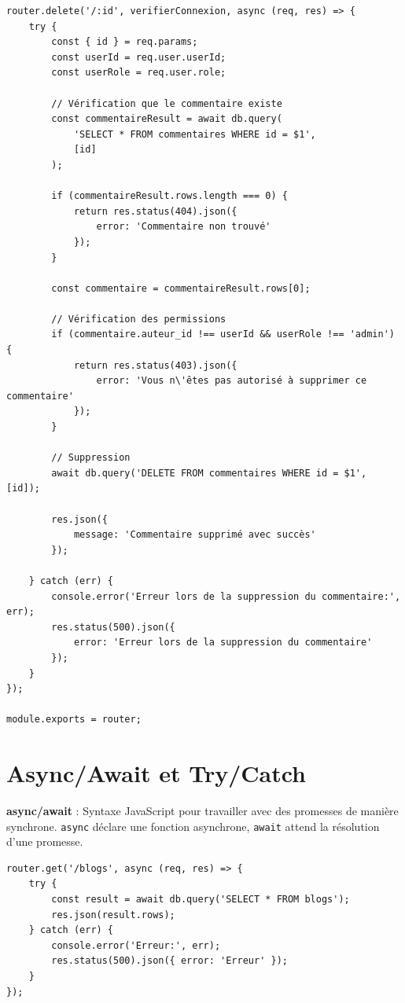 \begin{lstlisting}[style=javascript, caption=routes/commentaires.js - Routes des commentaires complètes]
router.delete('/:id', verifierConnexion, async (req, res) => {
    try {
        const { id } = req.params;
        const userId = req.user.userId;
        const userRole = req.user.role;
        
        // Vérification que le commentaire existe
        const commentaireResult = await db.query(
            'SELECT * FROM commentaires WHERE id = $1',
            [id]
        );
        
        if (commentaireResult.rows.length === 0) {
            return res.status(404).json({ 
                error: 'Commentaire non trouvé' 
            });
        }
        
        const commentaire = commentaireResult.rows[0];
        
        // Vérification des permissions
        if (commentaire.auteur_id !== userId && userRole !== 'admin') {
            return res.status(403).json({ 
                error: 'Vous n\'êtes pas autorisé à supprimer ce commentaire' 
            });
        }
        
        // Suppression
        await db.query('DELETE FROM commentaires WHERE id = $1', [id]);
        
        res.json({ 
            message: 'Commentaire supprimé avec succès' 
        });
        
    } catch (err) {
        console.error('Erreur lors de la suppression du commentaire:', err);
        res.status(500).json({ 
            error: 'Erreur lors de la suppression du commentaire' 
        });
    }
});

module.exports = router;
\end{lstlisting}

\section{Async/Await et Try/Catch}

\begin{definitionbox}
    \textbf{async/await} : Syntaxe JavaScript pour travailler avec des promesses de manière synchrone. \texttt{async} déclare une fonction asynchrone, \texttt{await} attend la résolution d'une promesse.
\end{definitionbox}

\begin{lstlisting}[style=javascript, caption=Pattern async/await avec try/catch]
router.get('/blogs', async (req, res) => {
    try {
        const result = await db.query('SELECT * FROM blogs');
        res.json(result.rows);
    } catch (err) {
        console.error('Erreur:', err);
        res.status(500).json({ error: 'Erreur' });
    }
});
\end{lstlisting}

